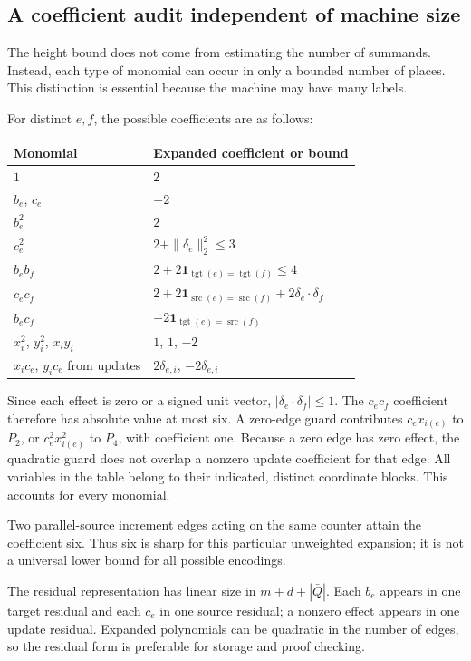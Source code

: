 \documentclass[11pt,letterpaper]{article}
\theoremstyle{definition}
\theoremstyle{remark}
\newcommand{\src}{\operatorname{src}}
\newcommand{\tgt}{\operatorname{tgt}}
\newcommand{\1}{\mathbf 1}
\begin{document}
\subsection{A coefficient audit independent of machine size}\label{lbh:ql:sec:height}
The height bound does not come from estimating the number of summands.
Instead, each type of monomial can occur in only a bounded number of places.
This distinction is essential because the machine may have many labels.

For distinct $e,f$, the possible coefficients are as follows:
\begin{center}
\begin{tabular}{ll}
\toprule
Monomial & Expanded coefficient or bound\\
\midrule
$1$ & $2$\\
$b_e$, $c_e$ & $-2$\\
$b_e^2$ & $2$\\
$c_e^2$ & $2+\|\delta_e\|_2^2\leq3$\\
$b_e b_f$ & $2+2\1_{\tgt(e)=\tgt(f)}\leq4$\\
$c_e c_f$ & $2+2\1_{\src(e)=\src(f)}+2\delta_e\cdot\delta_f$\\
$b_e c_f$ & $-2\1_{\tgt(e)=\src(f)}$\\
$x_i^2$, $y_i^2$, $x_i y_i$ & $1$, $1$, $-2$\\
$x_i c_e$, $y_i c_e$ from updates & $2\delta_{e,i}$, $-2\delta_{e,i}$\\
\bottomrule
\end{tabular}
\end{center}
Since each effect is zero or a signed unit vector,
$|\delta_e\cdot\delta_f|\leq1$. The $c_ec_f$ coefficient therefore has
absolute value at most six. A zero-edge guard contributes $c_e x_{i(e)}$
to $P_2$, or $c_e^2x_{i(e)}^2$ to $P_4$, with coefficient one. Because a zero
edge has zero effect, the quadratic guard does not overlap a nonzero update
coefficient for that edge. All variables in the table belong to their indicated,
distinct coordinate blocks. This accounts for every monomial.

Two parallel-source increment edges acting on the same counter attain the
coefficient six. Thus six is sharp for this particular unweighted expansion;
it is not a universal lower bound for all possible encodings.

The residual representation has linear size in $m+d+|\bar Q|$. Each $b_e$
appears in one target residual and each $c_e$ in one source residual; a
nonzero effect appears in one update residual. Expanded polynomials can be
quadratic in the number of edges, so the residual form is preferable for
storage and proof checking.
\end{document}
